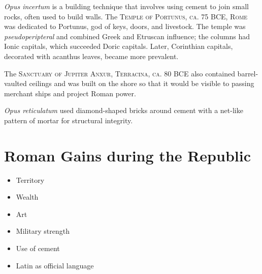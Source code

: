 \documentclass{article}
\begin{document}
\textit{Opus incertum} is a building technique that involves using cement to join small rocks, often used to build walls.  The \textsc{Temple of Portunus, ca. 75 BCE, Rome} was dedicated to Portunus, god of keys, doors, and livestock.  The temple was \textit{pseudoperipteral} and combined Greek and Etruscan influence; the columns had Ionic capitals, which succeeded Doric capitals.  Later, Corinthian capitals, decorated with acanthus leaves, became more prevalent.

The \textsc{Sanctuary of Jupiter Anxur, Terracina, ca. 80 BCE} also contained barrel-vaulted ceilings and was built on the shore so that it would be visible to passing merchant ships and project Roman power.

\textit{Opus reticulatum} used diamond-shaped bricks around cement with a net-like pattern of mortar for structural integrity.
\section{Roman Gains during the Republic}
\begin{itemize}
\item Territory
\item Wealth
\item Art
\item Military strength
\item Use of cement
\item Latin as official language
\end{itemize}
\end{document}
